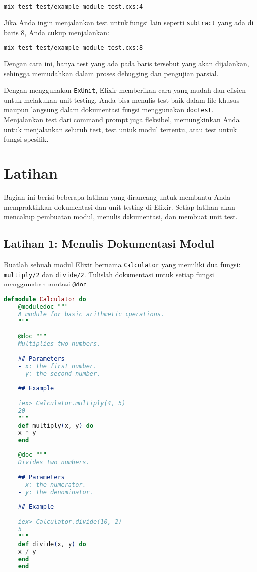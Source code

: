 \begin{lstlisting}[language=Bash]
	mix test test/example_module_test.exs:4
\end{lstlisting}

Jika Anda ingin menjalankan test untuk fungsi lain seperti \texttt{subtract} yang ada di baris 8, Anda cukup menjalankan:

\begin{lstlisting}[language=Bash]
	mix test test/example_module_test.exs:8
\end{lstlisting}

Dengan cara ini, hanya test yang ada pada baris tersebut yang akan dijalankan, sehingga memudahkan dalam proses debugging dan pengujian parsial.

Dengan menggunakan \texttt{ExUnit}, Elixir memberikan cara yang mudah dan efisien untuk melakukan unit testing. Anda bisa menulis test baik dalam file khusus maupun langsung dalam dokumentasi fungsi menggunakan \texttt{doctest}. Menjalankan test dari command prompt juga fleksibel, memungkinkan Anda untuk menjalankan seluruh test, test untuk modul tertentu, atau test untuk fungsi spesifik.

\section{Latihan}

Bagian ini berisi beberapa latihan yang dirancang untuk membantu Anda mempraktikkan dokumentasi dan unit testing di Elixir. Setiap latihan akan mencakup pembuatan modul, menulis dokumentasi, dan membuat unit test. 

\subsection{Latihan 1: Menulis Dokumentasi Modul}

Buatlah sebuah modul Elixir bernama \texttt{Calculator} yang memiliki dua fungsi: \texttt{multiply/2} dan \texttt{divide/2}. Tulislah dokumentasi untuk setiap fungsi menggunakan anotasi \texttt{@doc}.

\begin{lstlisting}[language=Elixir]
	defmodule Calculator do
	@moduledoc """
	A module for basic arithmetic operations.
	"""
	
	@doc """
	Multiplies two numbers.
	
	## Parameters
	- x: the first number.
	- y: the second number.
	
	## Example
	
	iex> Calculator.multiply(4, 5)
	20
	"""
	def multiply(x, y) do
	x * y
	end
	
	@doc """
	Divides two numbers.
	
	## Parameters
	- x: the numerator.
	- y: the denominator.
	
	## Example
	
	iex> Calculator.divide(10, 2)
	5
	"""
	def divide(x, y) do
	x / y
	end
	end
\end{lstlisting}

